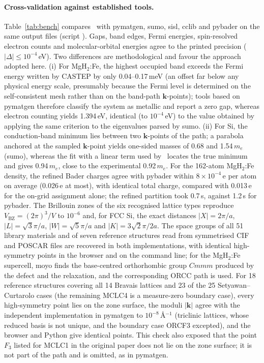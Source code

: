 
\paragraph{Cross-validation against established tools.} Table~\ref{tab:bench} compares \BMR\ with pymatgen, sumo, sisl, cclib and pybader on the same output files (script ). Gaps, band edges, Fermi energies, spin-resolved electron counts and molecular-orbital energies agree to the printed precision ($|\Delta|\le10^{-4}$\,eV). Two differences are methodological and favour the approach adopted here. (i) For MgH$_2$:Fe, the highest occupied band exceeds the Fermi energy written by CASTEP by only 0.04--0.17\,meV (an offset far below any physical energy scale, presumably because the Fermi level is determined on the self-consistent mesh rather than on the band-path $\bm k$-points); tools based on pymatgen therefore classify the system as metallic and report a zero gap, whereas electron counting yields 1.394\,eV, identical (to $10^{-4}$\,eV) to the value obtained by applying the same criterion to the eigenvalues parsed by sumo. (ii) For Si, the conduction-band minimum lies between two $\mathbf{k}$-points of the path; a parabola anchored at the sampled $\mathbf{k}$-point yields one-sided masses of 0.68 and 1.54\,$m_e$ (sumo), whereas the fit with a linear term used by \BMR\ locates the true minimum and gives 0.94\,$m_e$, close to the experimental 0.92\,$m_e$. For the 162-atom MgH$_2$:Fe density, the refined Bader charges agree with pybader within $8\times10^{-4}$\,e per atom on average (0.026\,e at most), with identical total charge, compared with 0.013\,e for the on-grid assignment alone; the refined partition took 0.7\,s, against 1.2\,s for pybader. The Brillouin zones of the six recognised lattice types reproduce $V_\mathrm{BZ}=(2\pi)^3/V$ to $10^{-6}$ and, for FCC Si, the exact distances $|X|=2\pi/a$, $|L|=\sqrt3\pi/a$, $|W|=\sqrt5\pi/a$ and $|K|=3\sqrt2\pi/2a$. The space groups of all 51 library materials and of seven reference structures read from symmetrised CIF and POSCAR files are recovered in both implementations, with identical high-symmetry points in the browser and on the command line; for the MgH$_2$:Fe supercell, moyo finds the base-centred orthorhombic group $Cmmm$ produced by the defect and the relaxation, and the corresponding ORCC path is used. For 18 reference structures covering all 14 Bravais lattices and 23 of the 25 Setyawan--Curtarolo cases (the remaining MCLC4 is a measure-zero boundary case), every high-symmetry point lies on the zone surface, the moduli $|\bm k|$ agree with the independent implementation in pymatgen \cite{ong2013pymatgen} to $10^{-8}$\,\AA$^{-1}$ (triclinic lattices, whose reduced basis is not unique, and the boundary case ORCF3 excepted), and the browser and Python give identical points. This check also exposed that the point $F_3$ listed for MCLC1 in the original paper does not lie on the zone surface; it is not part of the path and is omitted, as in pymatgen.



